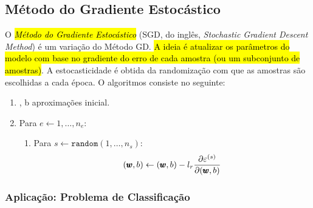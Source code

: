 \subsection{Método do Gradiente Estocástico}

O \hl{\emph{Método do Gradiente Estocástico}} (SGD, do inglês, \textit{Stochastic Gradient Descent Method}) é um variação do Método GD. \hl{A ideia é atualizar os parâmetros do modelo com base no gradiente do erro de cada amostra (ou um subconjunto de amostras)}. A estocasticidade é obtida da randomização com que as amostras são escolhidas a cada época. O algoritmos consiste no seguinte:
\begin{enumerate}[1.]
\item {}, b aproximações inicial.
\item Para $e\leftarrow 1,\dotsc, n_e$:
  \begin{enumerate}[1.1.]
  \item Para $s\leftarrow \texttt{random}(1,\dotsc, n_s)$:
    \begin{equation}
      (\pmb{w}, b) \leftarrow (\pmb{w}, b) - l_r\frac{\partial\varepsilon^{(s)}}{\partial(\pmb{w}, b)}
    \end{equation}
  \end{enumerate}
\end{enumerate}

\subsubsection{Aplicação: Problema de Classificação}

